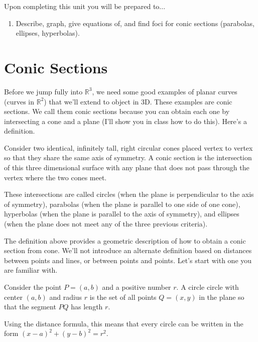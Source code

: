 \noindent 
Upon completing this unit you will be prepared to...
\begin{enumerate}

\item Describe, graph, give equations of, and find foci for conic sections (parabolas, ellipses, hyperbolas). 


\end{enumerate}



\section{Conic Sections}
Before we jump fully into $\mathbb{R}^3$, we need some good examples of planar curves (curves in $\mathbb{R}^2$) that we'll extend to object in 3D.  These examples are conic sections. We call them conic sections because you can obtain each one by intersecting a cone and a plane (I'll show you in class how to do this).  Here's a definition.

\begin{definition}
Consider two identical, infinitely tall, right circular cones placed
vertex to vertex so that they share the same axis of symmetry.  A conic
section is the intersection of this three dimensional surface with any plane that does
not pass through the vertex where the two cones meet.
\end{definition}

These intersections are called circles (when the plane is perpendicular to the axis of symmetry),
parabolas (when the plane is parallel to one side of one cone), hyperbolas (when the plane
is parallel to the axis of symmetry), and ellipses (when the plane does not meet any of the
three previous criteria). 

The definition above provides a geometric description of how to obtain a conic section from cone.  We'll not introduce an alternate definition based on distances between points and lines, or between points and points.  Let's start with one you are familiar with.

\begin{definition}
Consider the point $P=(a,b)$ and a positive number $r.$ A circle 
circle with center $(a,b)$ and radius $r$ is
the set of all points $Q=(x,y)$ in the plane so that the segment $PQ$ has length $r$. 
\end{definition}

Using the distance formula, this means that every circle can be written in the form $(x-a)^2+(y-b)^2=r^2$. 

